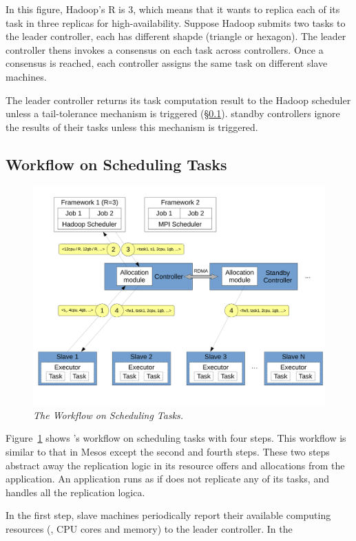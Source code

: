 In this figure, Hadoop's R is 3, which means that it wants to replica each of 
its task in three replicas for high-availability. Suppose Hadoop submits two 
tasks to the leader controller, each has different shapde (triangle or hexagon). 
The leader controller thens invokes a consensus on each task across controllers. 
Once a consensus is reached, each controller assigns the same task on different 
slave machines.

The leader controller returns its task computation result to the Hadoop 
scheduler unless a tail-tolerance mechanism is triggered 
(\S\ref{sec:workflow}). standby controllers ignore the results of their tasks 
unless this mechanism is triggered.



\subsection{Workflow on Scheduling Tasks} \label{sec:workflow}

\begin{figure}[t]
\vspace{.20in}
\centering
\includegraphics[width=.47\textwidth]{figures/flow}
\vspace{.06in}
\caption{{\em The \xxx Workflow on Scheduling Tasks.}} \label{fig:workflow}
\vspace{-.05in}
\end{figure}

Figure~\ref{fig:workflow} shows \xxx's workflow on scheduling tasks with four 
steps. This workflow is similar to that in Mesos except the second and fourth 
steps. These two steps \xxx abstract away the replication logic in its resource 
offers and allocations from the application. An application runs as if \xxx does 
not replicate any of its tasks, and \xxx handles all the replication logica.

In the first step, slave machines periodically report their available computing 
resources (\eg, CPU cores and memory) to the leader controller. In the 

